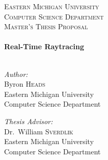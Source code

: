 \begin{titlepage}
    \begin{center}
        \textsc{\large Eastern Michigan University}\\[1.5cm]
        \textsc{\large Computer Science Department}\\
        \textsc{\large Master's Thesis Proposal}\\[0.5cm]
        \HRule\\[0.4cm]
        { \huge \bfseries  Real-Time Raytracing }\\[0.4cm]
        \HRule\\[1.5cm]

        \begin{minipage}{0.45\textwidth}
            \begin{flushleft} \large
                \emph{Author:}\\
                Byron \textsc{Heads} \\
                \small Eastern Michigan University\\
                \small Computer Science Department \\
            \end{flushleft}
        \end{minipage}
        \begin{minipage}{0.45\textwidth}
            \begin{flushright} \large
                \emph{Thesis Advisor:} \\
                Dr.~William \textsc{Sverdlik}\\
                \small Eastern Michigan University\\
                \small Computer Science Department
            \end{flushright}
        \end{minipage}

        \vfill


\end{center}
\end{titlepage}
